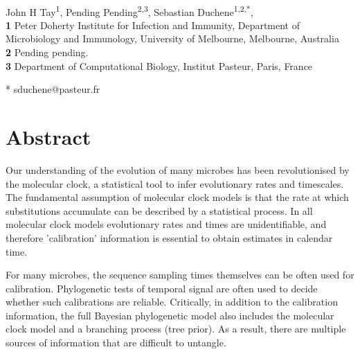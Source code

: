 \documentclass[10pt,letterpaper]{article}
\begin{document}
\vspace*{0.2in}

\begin{flushleft}
{\Large
\textbf{} %
}
\newline
\\
John H Tay\textsuperscript{1},
Pending Pending\textsuperscript{2,3},
Sebastian Duchene\textsuperscript{1,2,*},
\\
\bigskip
\textbf{1} Peter Doherty Institute for Infection and Immunity, Department of Microbiology and Immunology, University of Melbourne, Melbourne, Australia
\\
\textbf{2} Pending pending.
\\
\textbf{3} Department of Computational Biology, Institut Pasteur, Paris, France
\\
\bigskip

% 


* sduchene@pasteur.fr

\end{flushleft}
\section*{Abstract}
Our understanding of the evolution of many microbes has been revolutionised by the molecular clock, a statistical tool to infer evolutionary rates and timescales. The fundamental assumption of molecular clock models is that the rate at which substitutions accumulate can be described by a statistical process. In all molecular clock models evolutionary rates and times are unidentifiable, and therefore 'calibration' information is essential to obtain estimates in calendar time.

For many microbes, the sequence sampling times themselves can be often used for calibration. Phylogenetic tests of temporal signal are often used to decide whether such calibrations are reliable. Critically, in addition to the calibration information, the full Bayesian phylogenetic model also includes the molecular clock model and a branching process (tree prior). As a result, there are multiple sources of information that are difficult to untangle.
\end{document}
